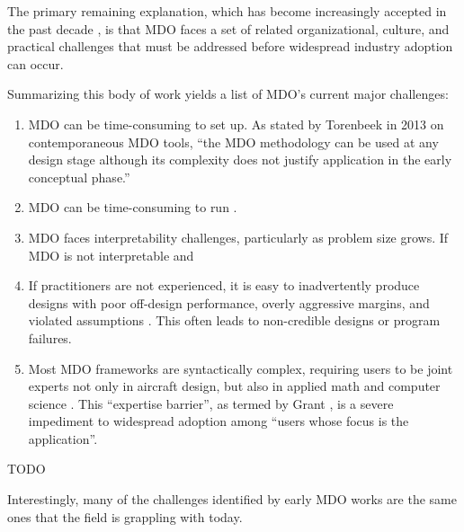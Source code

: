 \documentclass[12pt,vi,oneside]{report}
\begin{document}
    The primary remaining explanation, which has become increasingly accepted in the past decade \cite{agte_mdo_2010, torenbeek_advanced_2013, gazaix_industrialization_2017, gpkit}, is that MDO faces a set of related organizational, culture, and practical challenges that must be addressed before widespread industry adoption can occur.

    Summarizing this body of work yields a list of MDO's current major challenges:
    \begin{enumerate}
        \item MDO can be time-consuming to set up. As stated by Torenbeek in 2013 \cite{torenbeek_advanced_2013} on contemporaneous MDO tools, ``the MDO methodology can be used at any design stage although its complexity does not justify application in the early conceptual phase.''
        \item MDO can be time-consuming to run \cite{gpkit}.
        \item MDO faces interpretability challenges, particularly as problem size grows. If MDO is not interpretable and
        \item If practitioners are not experienced, it is easy to inadvertently produce designs with poor off-design performance, overly aggressive margins, and violated assumptions \cite{torenbeek_advanced_2013, drela_pros_1998, ozturk_optimal_2021}. This often leads to non-credible designs or program failures.
        \item Most MDO frameworks are syntactically complex, requiring users to be joint experts not only in aircraft design, but also in applied math and computer science \cite{salas_framework_1998, gpkit, agte_mdo_2010}. This ``expertise barrier'', as termed by Grant \cite{grant_disciplined_2006}, is a severe impediment to widespread adoption among ``users whose focus is the application''.
    \end{enumerate}

    TODO



    Interestingly, many of the challenges identified by early MDO works \cite{kroo_multidisciplinary_1997, ashley_making_1982} are the same ones that the field is grappling with today.

\end{document}
